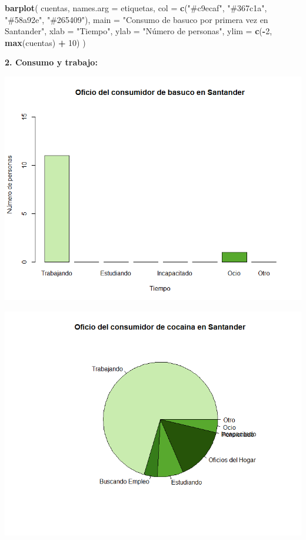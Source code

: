 \documentclass[
]{article}
\newenvironment{Shaded}{\begin{snugshade}}{\end{snugshade}}
\newcommand{\AttributeTok}[1]{\textcolor[rgb]{0.13,0.29,0.53}{#1}}
\newcommand{\DecValTok}[1]{\textcolor[rgb]{0.00,0.00,0.81}{#1}}
\newcommand{\FunctionTok}[1]{\textcolor[rgb]{0.13,0.29,0.53}{\textbf{#1}}}
\newcommand{\NormalTok}[1]{#1}
\newcommand{\SpecialCharTok}[1]{\textcolor[rgb]{0.81,0.36,0.00}{\textbf{#1}}}
\newcommand{\StringTok}[1]{\textcolor[rgb]{0.31,0.60,0.02}{#1}}
\begin{document}
\begin{Shaded}
\begin{Highlighting}[]
\FunctionTok{barplot}\NormalTok{(}
\NormalTok{  cuentas,}
  \AttributeTok{names.arg =}\NormalTok{ etiquetas,}
  \AttributeTok{col =} \FunctionTok{c}\NormalTok{(}\StringTok{"\#c9ecaf"}\NormalTok{, }\StringTok{"\#367c1a"}\NormalTok{, }\StringTok{"\#58a92e"}\NormalTok{, }\StringTok{"\#265409"}\NormalTok{),}
  \AttributeTok{main =} \StringTok{"Consumo de basuco por primera vez en Santander"}\NormalTok{,}
  \AttributeTok{xlab =} \StringTok{"Tiempo"}\NormalTok{,}
  \AttributeTok{ylab =} \StringTok{"Número de personas"}\NormalTok{,}
  \AttributeTok{ylim =} \FunctionTok{c}\NormalTok{(}\SpecialCharTok{{-}}\DecValTok{2}\NormalTok{, }\FunctionTok{max}\NormalTok{(cuentas) }\SpecialCharTok{+} \DecValTok{10}\NormalTok{)}
\NormalTok{)}
\end{Highlighting}
\end{Shaded}

\hfill\break

\textbf{2. Consumo y trabajo:}

\includegraphics{images/Basuco oficio Santander.png}

\includegraphics{images/cocaina oficio santander.png}
\end{document}
